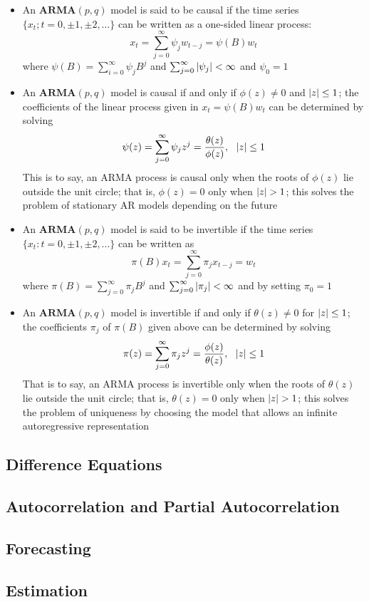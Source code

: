 \documentclass[12pt]{article}
\newcommand{\arma}[2]{$\mathbf{ARMA}(#1, #2)$}
\begin{document}
\begin{itemize}
\item An \arma{p}{q} model is said to be causal if the time series $\{x_t; t = 0, \pm 1, \pm 2, \dots\}$ can be written as a one-sided linear process: $$ x_t = \sum_{j=0}^\infty \psi_jw_{t-j} = \psi(B)w_t $$ where $\psi(B) = \sum_{i=0}^\infty \psi_jB^j$ and $\sum_{j=0}^\infty \abs{\psi_j} < \infty$ and $\psi_0 = 1$
\item An \arma{p}{q} model is causal if and only if $\phi(z) \neq 0$ and $\abs{z} \leq 1$; the coefficients of the linear process given in $x_t = \psi(B)w_t$ can be determined by solving $$ \psi(z) = \sum_{j=0}^\infty \psi_jz^j = \frac{\theta(z)}{\phi(z)}, ~~ \abs{z} \leq 1 $$ This is to say, an ARMA process is causal only when the roots of $\phi(z)$ lie outside the unit circle; that is, $\phi(z) = 0$ only when $\abs{z} > 1$; this solves the problem of stationary AR models depending on the future
\item An \arma{p}{q} model is said to be invertible if the time series $\{x_t: t = 0, \pm 1, \pm 2, \dots\}$ can be written as $$ \pi(B)x_t = \sum_{j=0}^\infty \pi_jx_{t-j} = w_t $$ where $\pi(B) = \sum_{j=0}^\infty \pi_jB^j$ and $\sum_{j=0}^\infty \abs{\pi_j} < \infty$ and by setting $\pi_0 = 1$
\item An \arma{p}{q} model is invertible if and only if $\theta(z) \neq 0$ for $\abs{z} \leq 1$; the coefficients $\pi_j$ of $\pi(B)$ given above can be determined by solving $$ \pi(z) = \sum_{j=0}^\infty \pi_jz^j = \frac{\phi(z)}{\theta(z)}, ~~ \abs{z} \leq 1 $$ That is to say, an ARMA process is invertible only when the roots of $\theta(z)$ lie outside the unit circle; that is, $\theta(z) = 0$ only when $\abs{z} > 1$; this solves the problem of uniqueness by choosing the model that allows an infinite autoregressive representation
\end{itemize}
\subsection{Difference Equations}

\subsection{Autocorrelation and Partial Autocorrelation}

\subsection{Forecasting}

\subsection{Estimation}
\end{document}
